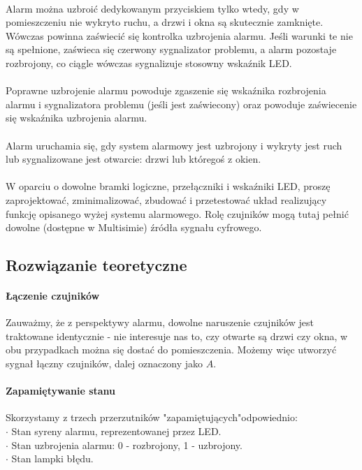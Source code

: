 \documentclass{article}
\begin{document}
\paragraph{}
Alarm można uzbroić dedykowanym przyciskiem tylko wtedy, gdy w pomieszczeniu nie wykryto ruchu, a drzwi i okna są skutecznie zamknięte. Wówczas powinna zaświecić się kontrolka uzbrojenia alarmu. Jeśli warunki te nie są spełnione, zaświeca się czerwony sygnalizator problemu, a alarm pozostaje rozbrojony, co ciągle wówczas sygnalizuje stosowny wskaźnik LED.
\paragraph{}
Poprawne uzbrojenie alarmu powoduje zgaszenie się wskaźnika rozbrojenia alarmu i sygnalizatora problemu (jeśli jest zaświecony) oraz powoduje zaświecenie się wskaźnika uzbrojenia alarmu.
\paragraph{}
Alarm uruchamia się, gdy system alarmowy jest uzbrojony i wykryty jest ruch lub sygnalizowane jest otwarcie: drzwi lub któregoś z okien.
\paragraph{}
W oparciu o dowolne bramki logiczne, przełączniki i wskaźniki LED, proszę zaprojektować, zminimalizować, zbudować i przetestować układ realizujący funkcję opisanego wyżej systemu alarmowego. Rolę czujników mogą tutaj pełnić dowolne (dostępne w Multisimie) źródła sygnału cyfrowego.
\subsection{Rozwiązanie teoretyczne}
\paragraph{Łączenie czujników}
Zauważmy, że z perspektywy alarmu, dowolne naruszenie czujników jest traktowane identycznie - nie interesuje nas to, czy otwarte są drzwi czy okna, w obu przypadkach można się dostać do pomieszczenia. Możemy więc utworzyć sygnał łączny czujników, dalej oznaczony jako $A$.
\paragraph{Zapamiętywanie stanu}
Skorzystamy z trzech przerzutników "zapamiętujących"odpowiednio: \\
$\cdot$ Stan syreny alarmu, reprezentowanej przez LED. \\
$\cdot$ Stan uzbrojenia alarmu: 0 - rozbrojony, 1 - uzbrojony. \\
$\cdot$ Stan lampki błędu. \\
\end{document}
